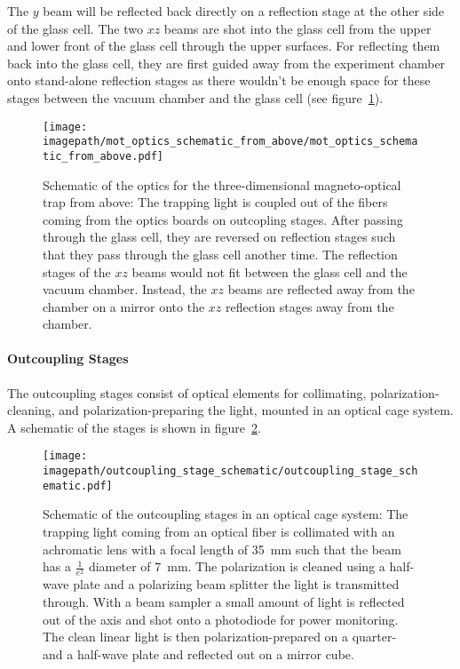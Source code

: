 The $y$ beam will be reflected back directly on a reflection stage at the other side of the glass cell. The two $xz$ beams are shot into the glass cell from the upper and lower front of the glass cell through the upper surfaces. For reflecting them back into the glass cell, they are first guided away from the experiment chamber onto stand-alone reflection stages as there wouldn't be enough space for these stages between the vacuum chamber and the glass cell (see figure~\ref{fig:mot_optics_schematic_from_above}).

\begin{figure}
    \centering
    \texttt{[image: \\imagepath/mot\_optics\_schematic\_from\_above/mot\_optics\_schematic\_from\_above.pdf]}
    \caption{Schematic of the optics for the three-dimensional magneto-optical trap from above: The trapping light is coupled out of the fibers coming from the optics boards on outcopling stages. After passing through the glass cell, they are reversed on reflection stages such that they pass through the glass cell another time. The reflection stages of the $xz$ beams would not fit between the glass cell and the vacuum chamber. Instead, the $xz$ beams are reflected away from the chamber on a mirror onto the $xz$ reflection stages away from the chamber.}
    \label{fig:mot_optics_schematic_from_above}
\end{figure}

\paragraph{Outcoupling Stages}
The outcoupling stages consist of optical elements for collimating, polarization-cleaning, and polarization-preparing the light, mounted in an optical cage system. A schematic of the stages is shown in figure~\ref{fig:outcoupling_stage_schematic}.

\begin{figure}
    \centering
    \texttt{[image: \\imagepath/outcoupling\_stage\_schematic/outcoupling\_stage\_schematic.pdf]}
    \caption{Schematic of the outcoupling stages in an optical cage system: The trapping light coming from an optical fiber is collimated with an achromatic lens with a focal length of \SI{35}{\milli\meter} such that the beam has a $\frac{1}{e^2}$ diameter of \SI{7}{\milli\meter}. The polarization is cleaned using a half-wave plate and a polarizing beam splitter the light is transmitted through. With a beam sampler a small amount of light is reflected out of the axis and shot onto a photodiode for power monitoring. The clean linear light is then polarization-prepared on a quarter- and a half-wave plate and reflected out on a mirror cube.}
    \label{fig:outcoupling_stage_schematic}
\end{figure}


